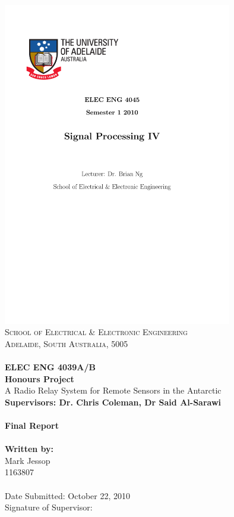 \documentclass[a4paper,12pt]{article}
\begin{document}
\thispagestyle{empty}
\vspace*{\fill}
\includegraphics[width=10cm]{./UofAlogo.pdf}\\
\noindent
\textsc{
\textsc{School of Electrical \& Electronic Engineering}\\
Adelaide, South Australia, 5005\\ \\
}
\noindent
\Large{\textbf{
ELEC ENG 4039A/B \\
Honours Project\\
	}}
	\Large{
		A Radio Relay System for Remote Sensors in the Antarctic \\
	}
	\small{\textbf{Supervisors: Dr. Chris Coleman, Dr Said Al-Sarawi}}
	\ \\
	\ \\
	\Large{\textbf{
		Final Report \\
	}}
	\ \\
	\small{\textbf{
		Written by: \\}
		Mark Jessop \\
		1163807
	}
	\ \\
	\ \\
	Date Submitted: October 22, 2010 \\
	Signature of Supervisor: \\
 \vspace*{\fill}
\end{document}
